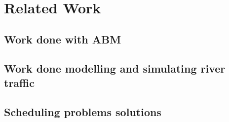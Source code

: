 \chapter{Related Work}
  \section{Work done with ABM}

  \section{Work done modelling and simulating river traffic}

  \section{Scheduling problems solutions}
